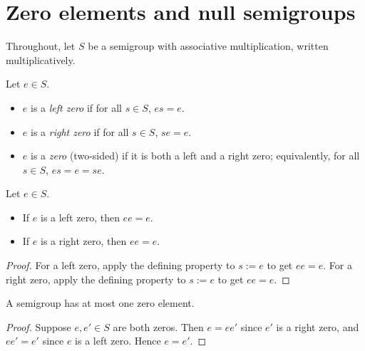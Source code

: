 
\section{Zero elements and null semigroups}

Throughout, let \(S\) be a semigroup with associative multiplication, written multiplicatively.

\begin{definition}
\label{def:zeros}
\leanok
Let \(e\in S\).
\begin{itemize}
  \item \(e\) is a \emph{left zero} if for all \(s\in S\), \(e s = e\).
  \item \(e\) is a \emph{right zero} if for all \(s\in S\), \(s e = e\).
  \item \(e\) is a \emph{zero} (two-sided) if it is both a left and a right zero; equivalently, for all \(s\in S\), \(e s = e = s e\).
\end{itemize}
\end{definition}

\begin{lemma}
\label{lem:zero-idempotent}
\leanok
Let \(e\in S\).
\begin{itemize}
  \item If \(e\) is a left zero, then \(e e = e\).
  \item If \(e\) is a right zero, then \(e e = e\).
\end{itemize}
\end{lemma}
\begin{proof}
For a left zero, apply the defining property to \(s:=e\) to get \(e e = e\).
For a right zero, apply the defining property to \(s:=e\) to get \(e e = e\).
\end{proof}

\begin{lemma}
\label{lem:zero-unique}
\leanok
A semigroup has at most one zero element.
\end{lemma}
\begin{proof}
Suppose \(e,e'\in S\) are both zeros. Then \(e = e e'\) since \(e'\) is a right zero, and \(e e' = e'\) since \(e\) is a left zero. Hence \(e = e'\).
\end{proof}

